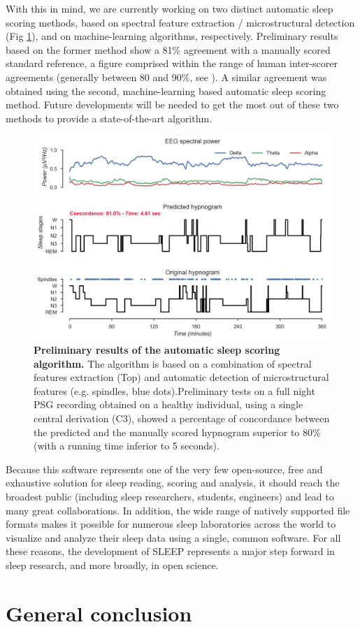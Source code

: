 With this in mind, we are currently working on two distinct automatic sleep scoring methods, based on spectral feature extraction / microstructural detection (Fig \ref{fig:disc:methods:future:autoscore}), and on machine-learning algorithms, respectively. Preliminary results based on the former method show a 81\% agreement with a manually scored standard reference, a figure comprised within the range of human inter-scorer agreements (generally between 80 and 90\%, see \citealp{silber_visual_2007}). A similar agreement was obtained using the second, machine-learning based automatic sleep scoring method. Future developments will be needed to get the most out of these two methods to provide a state-of-the-art algorithm.

\begin{figure}[htb]
	\includegraphics[width=\textwidth]{Fig/Discussion/autoscore.png}
	\caption[Preliminary results of the automatic sleep scoring algorithm]{\textbf{Preliminary results of the automatic sleep scoring algorithm.} The algorithm is based on a combination of spectral features extraction (Top) and automatic detection of microstructural features (e.g. spindles, blue dots).Preliminary tests on a full night PSG recording obtained on a healthy individual, using a single central derivation (C3), showed a percentage of concordance between the predicted and the manually scored hypnogram superior to 80\% (with a running time inferior to 5 seconds).}
	\label{fig:disc:methods:future:autoscore}
\end{figure}

Because this software represents one of the very few open-source, free and exhaustive solution for sleep reading, scoring and analysis, it should reach the broadest public (including sleep researchers, students, engineers) and lead to many great collaborations. In addition, the wide range of natively supported file formats makes it possible for numerous sleep laboratories across the world to visualize and analyze their sleep data using a single, common software. For all these reasons, the development of SLEEP represents a major step forward in sleep research, and more broadly, in open science.


\cleardoublepage
\chapter{General conclusion}
\label{disc:conclusion}
